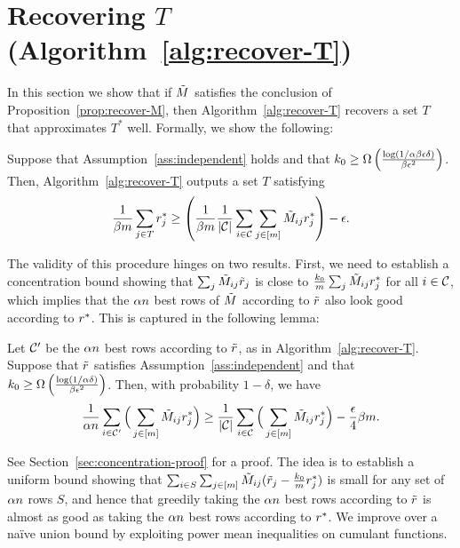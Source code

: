 \section{Recovering $T$ (Algorithm~\ref{alg:recover-T})}
\label{sec:approach-T}
\label{sec:rounding}

In this section we show that if $\tilde{M}$ satisfies the conclusion of 
Proposition~\ref{prop:recover-M}, then Algorithm~\ref{alg:recover-T} 
recovers a set $T$ that approximates $T^*$ well. Formally, we show 
the following:
\begin{proposition}
\label{prop:recover-T}
Suppose that Assumption~\ref{ass:independent} holds and that 
$k_0 \geq \Omega\left( \frac{\log(1/\alpha\beta\epsilon\delta)}{\beta\epsilon^2} \right)$. 
Then, Algorithm~\ref{alg:recover-T} outputs a set $T$ satisfying 
\begin{equation}
\label{eq:recover-T}
\frac{1}{\beta m}\sum_{j \in T} r^*_j \geq \left( \frac{1}{\beta m}\frac{1}{|\mathcal{C}|}\sum_{i \in \mathcal{C}} \sum_{j \in [m]} \tilde{M}_{ij}r^*_j \right) - \epsilon.
\end{equation}
\end{proposition}
The validity of this procedure hinges on two results. First, we need to establish 
a concentration bound showing that $\sum_j \tilde{M}_{ij}\tilde{r}_j$ is close to 
$\frac{k_0}{m}\sum_j \tilde{M}_{ij}r^*_j$ for all $i \in \mathcal{C}$, which implies that 
the $\alpha n$ best rows of $\tilde{M}$ according to $\tilde{r}$ also look good 
according to $r^*$. This is captured in the following lemma:
\begin{lemma}
\label{lem:robs-rtrue}
Let $\mathcal{C}'$ be the $\alpha n$ best rows according to $\tilde{r}$, as 
in Algorithm~\ref{alg:recover-T}. 
Suppose that $\tilde{r}$ satisfies Assumption~\ref{ass:independent} and that
$k_0 \geq \Omega\left( \frac{\log(1/\alpha\delta)}{\beta\epsilon^2} \right)$. 
Then, with probability $1-\delta$, we have
\begin{equation}
\label{eq:robs-rtrue}
\frac{1}{\alpha n} \sum_{i \in \mathcal{C}'} \Big(\sum_{j \in [m]} \tilde{M}_{ij}r^*_j\Big) \geq \frac{1}{|\mathcal{C}|} \sum_{i \in \mathcal{C}} \Big(\sum_{j \in [m]} \tilde{M}_{ij}r^*_j\Big) - \frac{\epsilon}{4}\beta m.
\end{equation}
\end{lemma}
See Section~\ref{sec:concentration-proof} for a proof.
The idea is to establish a uniform bound showing that 
$\sum_{i \in S} \sum_{j \in [m]} \tilde{M}_{ij}(\tilde{r}_j - \frac{k_0}{m}r^*_j)$ is small for any 
set of $\alpha n$ rows $S$, and hence that greedily taking the $\alpha n$ 
best rows according to $\tilde{r}$ is almost as good as taking the $\alpha n$ 
best rows according to $r^*$. We 
improve over a na\"{i}ve union bound by exploiting power mean 
inequalities on cumulant functions. 

